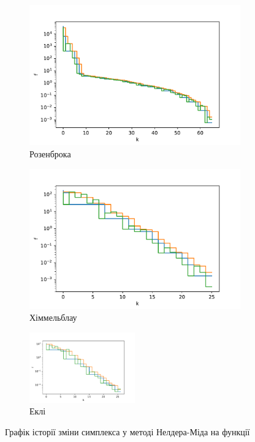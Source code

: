 \pagebreak
\begin{figure}[h!]
    \begin{subfigure}{0.5\textwidth}
        \includegraphics[width=\textwidth, trim=0cm 0cm 1.2cm 1cm, clip]{assets/NelderMead/rosenbrock_steps.pdf}
        \caption{Розенброка}
    \end{subfigure}
    \begin{subfigure}{0.5\textwidth}
        \includegraphics[width=\textwidth, trim=0cm 0cm 1.2cm 1cm, clip]{assets/NelderMead/himmelblau_steps.pdf}
        \caption{Хіммельблау}
    \end{subfigure}
    \begin{subfigure}{\textwidth}
        \centering
        \includegraphics[width=0.5\textwidth, trim=0cm 0cm 1.2cm 1cm, clip]{assets/NelderMead/ackley_steps.pdf}
        \caption{Еклі}
    \end{subfigure}
    \caption{Графік історії зміни симплекса у методі Нелдера-Міда на функції}
\end{figure}

